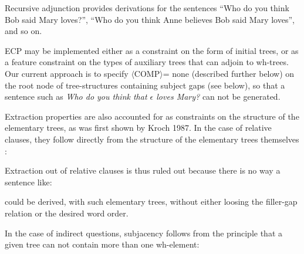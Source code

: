 

Recursive adjunction provides derivations for the sentences
``Who do you think Bob said Mary loves?'', ``Who do you think Anne believes Bob said Mary loves'', and so on.



ECP may be implemented either as a constraint on the form of initial
trees, or as a feature constraint on the types of auxiliary trees that
can adjoin to wh-trees. Our current approach is to specify $\langle$COMP$\rangle$= none 
(described further below) on the root node of 
tree-structures containing subject gaps (see below),
so that a sentence such as {\it  *Who do you think that $\epsilon$ loves Mary?}
can not be generated. 




Extraction properties are also accounted for as  constraints on the structure of the elementary trees, as was first shown by Kroch 1987\nocite{k87}. 
In the case of relative clauses, they follow directly from the structure of the 
elementary trees themselves :


Extraction out of relative clauses is thus ruled out because there is no way a sentence like:

\beginsentences
{}

\endsentences

\noindent could  be derived, with such elementary trees, without either loosing the filler-gap relation
or the desired word order.

In the case of indirect questions, subjacency follows from the principle that 
a given tree can not contain more than one wh-element:


